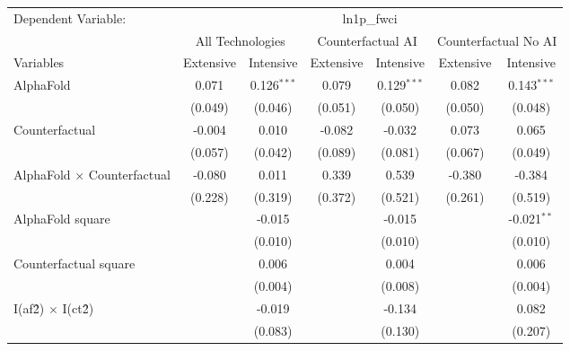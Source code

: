 \begingroup
\centering
\begin{tabular}{lcccccc}
   \tabularnewline \midrule \midrule
   Dependent Variable: & \multicolumn{6}{c}{ln1p\_fwci}\\
 & \multicolumn{2}{c}{All Technologies} & \multicolumn{2}{c}{Counterfactual AI} & \multicolumn{2}{c}{Counterfactual No AI} \\
\cmidrule(lr){1-1}\cmidrule(lr){2-3} \cmidrule(lr){4-5} \cmidrule(lr){6-7}
Variables & \multicolumn{1}{c}{Extensive} & \multicolumn{1}{c}{Intensive} & \multicolumn{1}{c}{Extensive} & \multicolumn{1}{c}{Intensive} & \multicolumn{1}{c}{Extensive} & \multicolumn{1}{c}{Intensive} \\
\cmidrule(lr){1-1}\cmidrule(lr){2-2} \cmidrule(lr){3-3} \cmidrule(lr){4-4} \cmidrule(lr){5-5} \cmidrule(lr){6-6} \cmidrule(lr){7-7}
   AlphaFold                          & 0.071   & 0.126$^{***}$ & 0.079   & 0.129$^{***}$ & 0.082   & 0.143$^{***}$\\   
                                      & (0.049) & (0.046)       & (0.051) & (0.050)       & (0.050) & (0.048)\\   
   Counterfactual                     & -0.004  & 0.010         & -0.082  & -0.032        & 0.073   & 0.065\\   
                                      & (0.057) & (0.042)       & (0.089) & (0.081)       & (0.067) & (0.049)\\   
   AlphaFold $\times$ Counterfactual  & -0.080  & 0.011         & 0.339   & 0.539         & -0.380  & -0.384\\   
                                      & (0.228) & (0.319)       & (0.372) & (0.521)       & (0.261) & (0.519)\\   
   AlphaFold square                   &         & -0.015        &         & -0.015        &         & -0.021$^{**}$\\   
                                      &         & (0.010)       &         & (0.010)       &         & (0.010)\\   
   Counterfactual square              &         & 0.006         &         & 0.004         &         & 0.006\\   
                                      &         & (0.004)       &         & (0.008)       &         & (0.004)\\   
   I(af\^2) $\times$ I(ct\^2)         &         & -0.019        &         & -0.134        &         & 0.082\\   
                                      &         & (0.083)       &         & (0.130)       &         & (0.207)\\   

\end{tabular}
